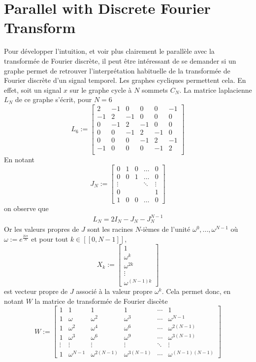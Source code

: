 \section{Parallel with Discrete Fourier Transform}
\label{app:fourier_t}

Pour développer l'intuition, et voir plus clairement le parallèle avec la transformée de Fourier discrète, il peut être intéressant de se demander si un graphe permet de retrouver l'interprétation habituelle de la transformée de Fourier discrète d'un signal temporel. Les graphes cycliques permettent cela. En effet, soit un signal $x$ sur le graphe cycle à $N$ sommets $C_N$. La matrice laplacienne $L_N$ de ce graphe s'écrit, pour $N=6$ 
\[ L_6 := 
\begin{bmatrix}
2 & -1 & 0 & 0 & 0 & -1 \\
-1 & 2 & -1 & 0 & 0 & 0 \\
0 & -1 & 2 & -1 & 0 & 0 \\
0 & 0 & -1 & 2 & -1 & 0 \\
0 & 0 & 0 & -1 & 2 & -1 \\
-1 & 0 & 0 & 0 & -1 & 2 \\
\end{bmatrix}
\]
En notant
\[J_N :=
\begin{bmatrix}
0 & 1 & 0 & \dots & 0 \\
0 & 0 & 1 & \dots & 0 \\
\vdots  &     &     & \ddots & \vdots  \\
0 & & &        & 1 \\
1 & 0 & 0 & \dots  & 0
\end{bmatrix}
\]
on observe que 
\begin{align}
    L_N = 2I_N - J_N - J_N^{N-1}
\end{align}
Or les valeurs propres de $J$ sont les racines $N$-ièmes de l'unité $\omega^0,...,\omega^{N-1}$ où $\omega := e^{\frac{2i\pi}{N}}$ et pour tout $k\in [\![0,N-1]\!]$, \[X_k := \begin{bmatrix} 1 \\\omega^k \\ \omega^{2k}\\ \vdots\\ \omega^{(N-1)k}\end{bmatrix}\]
est vecteur propre de $J$ associé à la valeur propre $\omega^k$.
Cela permet donc, en notant $W$ la matrice de transformée de Fourier discète
\[ W :=
\begin{bmatrix}
1&1&1&1&\cdots &1 \\
1&\omega&\omega^2&\omega^3&\cdots&\omega^{N-1} \\
1&\omega^2&\omega^4&\omega^6&\cdots&\omega^{2(N-1)}\\ 1&\omega^3&\omega^6&\omega^9&\cdots&\omega^{3(N-1)}\\
\vdots&\vdots&\vdots&\vdots&\ddots&\vdots\\
1&\omega^{N-1}&\omega^{2(N-1)}&\omega^{3(N-1)}&\cdots&\omega^{(N-1)(N-1)}
\end{bmatrix}
\]

